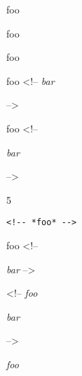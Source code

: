 
\def\mytitle{HTML Comments}


foo 

foo 

foo 

foo <!--
\emph{bar}

-->

foo <!--

\emph{bar}

-->

5

\begin{verbatim}
<!-- *foo* -->
\end{verbatim}

foo <!--

\emph{bar} -->

<!-- \emph{foo}

\emph{bar}

-->

\emph{foo}




